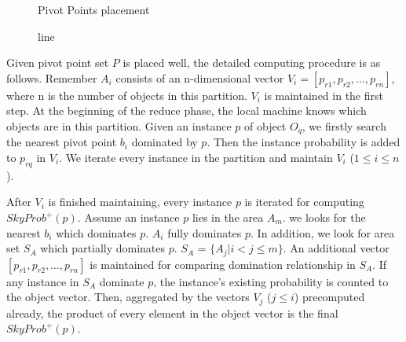 

\begin{figure}[!b]
\vspace{-15pt}
\centering
  \centerline{}
  \caption{Pivot Points placement}
  \vspace{-15pt}
  \label{figure:midLine}
\end{figure}

\begin{figure}[t]
\vspace{-15pt}
\centering
  \centerline{}
  \caption{line}
  \vspace{-15pt}
  \label{figure:testArea}
\end{figure}



Given pivot point set $P$ is placed well, the detailed computing procedure is as follows. Remember $A_i$ consists of an n-dimensional vector $V_i = [p_{r1},p_{r2},\dots,p_{rn}]$, where n is the number of objects in this partition. $V_i$ is maintained in the first step. At the beginning of the reduce phase, the local machine knows which objects are in this partition. Given an instance $p$ of object $O_q$, we firstly search the nearest pivot point $b_i$ dominated by $p$. Then the instance probability is added to $p_{rq}$ in $V_i$. We iterate every instance in the partition and maintain $V_i$ ($ 1 \leq i \leq n$). 

After $V_i$ is finished maintaining, every instance $p$ is iterated for computing $SkyProb^+(p)$. Assume an instance $p$ lies in the area $A_m$. we looks for the nearest $b_i$ which dominates $p$. $A_i$ fully dominates $p$. In addition, we look for area set $S_A$ which partially dominates $p$. $S_A$ = $\{A_j| i < j \leq m \}$.
An additional vector $[p_{r1},p_{r2},\dots,p_{rn}]$ is maintained for comparing domination relationship in $S_A$. If any instance in $S_A$ dominate $p$, the instance's existing probability is counted to the object vector. Then, aggregated by the vectors $V_j$ ($j \leq i$) precomputed already, the product of every element in the object vector is the final $SkyProb^+(p)$.

